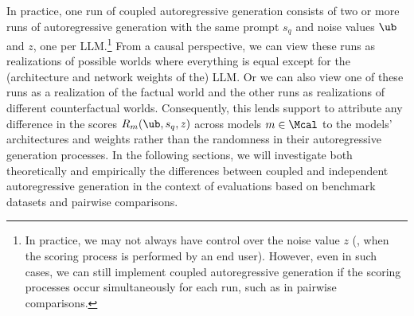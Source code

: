 In practice, one run of coupled autoregressive generation consists of two or more runs of autoregressive generation with the same prompt $s_q$ and
noise values $\ub$ and $z$, one per LLM.\footnote{In practice, we may not always have control over the noise value $z$ (\eg, when the scoring process is performed by an end user). 
%
However, even in such cases, we can still implement coupled autoregressive generation if the scoring processes occur simultaneously for each run, such as in pairwise comparisons.}
%
From a causal perspective, we can view these runs as realizations of possible worlds where everything is equal except for the (architecture and network weights of the) LLM.
%
Or we can also view one of these runs as a realization of the factual world and the 
other runs as realizations of different counterfactual worlds. 
%
Consequently, this lends support to attribute any difference in the scores $R_m (\ub, s_q, z)$ across models $m \in \Mcal$ to the models' architectures and weights rather than the randomness in their autoregressive generation processes. 
%
In the following sections, we will investigate both theoretically and empirically the differences between coupled and independent autoregressive generation in the context of evaluations based on benchmark datasets and pairwise comparisons.